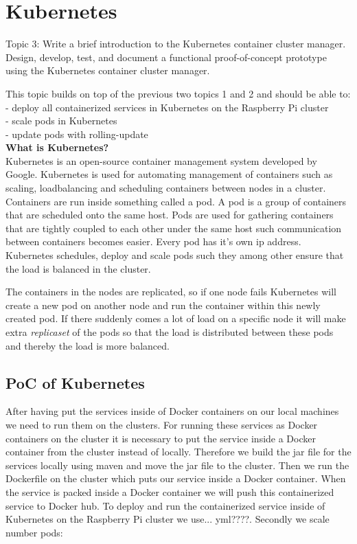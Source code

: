 \chapter{Kubernetes}\label{ch:kubernetes}
Topic 3: Write a brief introduction to the Kubernetes container cluster manager. 
Design, develop, test, and document a functional proof-of-concept prototype using the Kubernetes container cluster manager. 

This topic builds on top of the previous two topics 1 and 2 and should be able to:\\
- deploy all containerized services in Kubernetes on the Raspberry Pi cluster \\
- scale pods in Kubernetes \\
- update pods with rolling-update \\

\textbf{What is Kubernetes?}\\
Kubernetes is an open-source container management system developed by Google.
Kubernetes is used for automating management of containers such as scaling, loadbalancing and scheduling containers between nodes in a cluster. Containers are run inside something called a pod.
A pod is a group of containers that are scheduled onto the same host.
Pods are used for gathering containers that are tightly coupled to each other under the same host such communication between containers becomes easier. Every pod has it's own ip address. Kubernetes schedules, deploy and scale pods such they among other ensure that the load is balanced in the cluster. 

The containers in the nodes are replicated, so if one node fails Kubernetes will create a new pod on another node and run the container within this newly created pod. 
If there suddenly comes a lot of load on a specific node it will make extra \emph{replicaset} of the pods so that the load is distributed between these pods and thereby the load is more balanced. 

\section{PoC of Kubernetes}
After having put the services inside of Docker containers on our local machines we need to run them on the clusters. For running these services as Docker containers on the cluster it is necessary to put the service inside a Docker container from the cluster instead of locally. Therefore we build the jar file for the services locally using maven and move the jar file to the cluster. Then we run the Dockerfile on the cluster which puts our service inside a Docker container. When the service is packed inside a Docker container we will push this containerized service to Docker hub. To deploy and run the containerized service inside of Kubernetes on the Raspberry Pi cluster we use... yml????.
Secondly we scale number pods:

